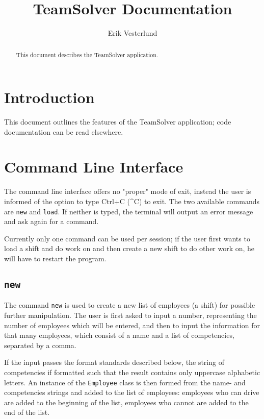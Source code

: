 \documentclass[a4paper, 11pt]{article}
\title{TeamSolver Documentation}
\author{Erik Vesterlund}
\begin{document}
\maketitle

\newpage
\begin{abstract}
This document describes the TeamSolver application. %
\end{abstract}

\newpage
\tableofcontents
\newpage

\section{Introduction}

This document outlines the features of the TeamSolver application; code documentation can be read elsewhere.

\section{Command Line Interface}

The command line interface offers no "proper" mode of exit, instead the user is informed of the option to type Ctrl+C (\textasciicircum C) to exit. The two available commands are \texttt{new} and \texttt{load}. If neither is typed, the terminal will output an error message and ask again for a command.

Currently only one command can be used per session; if the user first wants to load a shift and do work on and then create a new shift to do other work on, he will have to restart the program.

\subsection{\texttt{new}}

The command \texttt{new} is used to create a new list of employees (a shift) for possible further manipulation. The user is first asked to input a number, representing the number of employees which will be entered, and then to input the information for that many employees, which consist of a name and a list of competencies, separated by a comma.

If the input passes the format standards described below, the string of competencies if formatted such that the result contains only uppercase alphabetic letters. An instance of the \texttt{Employee} class is then formed from the name- and competencies strings and added to the list of employees: employees who can drive are added to the beginning of the list, employees who cannot are added to the end of the list.
\end{document}
